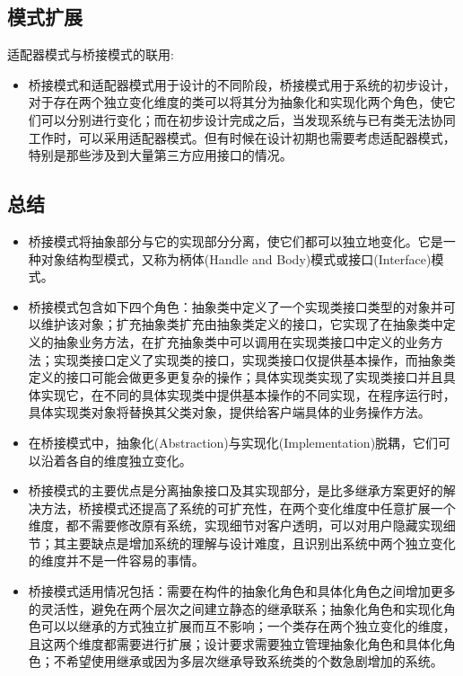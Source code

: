 \documentclass[letterpaper,10pt,english]{sphinxmanual}
\begin{document}
\subsection{模式扩展}
\label{\detokenize{structural_patterns/bridge:id14}}
\sphinxAtStartPar
适配器模式与桥接模式的联用:
\begin{itemize}
\item {} 
\sphinxAtStartPar
桥接模式和适配器模式用于设计的不同阶段，桥接模式用于系统的初步设计，对于存在两个独立变化维度的类可以将其分为抽象化和实现化两个角色，使它们可以分别进行变化；而在初步设计完成之后，当发现系统与已有类无法协同工作时，可以采用适配器模式。但有时候在设计初期也需要考虑适配器模式，特别是那些涉及到大量第三方应用接口的情况。

\end{itemize}


\subsection{总结}
\label{\detokenize{structural_patterns/bridge:id15}}\begin{itemize}
\item {} 
\sphinxAtStartPar
桥接模式将抽象部分与它的实现部分分离，使它们都可以独立地变化。它是一种对象结构型模式，又称为柄体(Handle and Body)模式或接口(Interface)模式。

\item {} 
\sphinxAtStartPar
桥接模式包含如下四个角色：抽象类中定义了一个实现类接口类型的对象并可以维护该对象；扩充抽象类扩充由抽象类定义的接口，它实现了在抽象类中定义的抽象业务方法，在扩充抽象类中可以调用在实现类接口中定义的业务方法；实现类接口定义了实现类的接口，实现类接口仅提供基本操作，而抽象类定义的接口可能会做更多更复杂的操作；具体实现类实现了实现类接口并且具体实现它，在不同的具体实现类中提供基本操作的不同实现，在程序运行时，具体实现类对象将替换其父类对象，提供给客户端具体的业务操作方法。

\item {} 
\sphinxAtStartPar
在桥接模式中，抽象化(Abstraction)与实现化(Implementation)脱耦，它们可以沿着各自的维度独立变化。

\item {} 
\sphinxAtStartPar
桥接模式的主要优点是分离抽象接口及其实现部分，是比多继承方案更好的解决方法，桥接模式还提高了系统的可扩充性，在两个变化维度中任意扩展一个维度，都不需要修改原有系统，实现细节对客户透明，可以对用户隐藏实现细节；其主要缺点是增加系统的理解与设计难度，且识别出系统中两个独立变化的维度并不是一件容易的事情。

\item {} 
\sphinxAtStartPar
桥接模式适用情况包括：需要在构件的抽象化角色和具体化角色之间增加更多的灵活性，避免在两个层次之间建立静态的继承联系；抽象化角色和实现化角色可以以继承的方式独立扩展而互不影响；一个类存在两个独立变化的维度，且这两个维度都需要进行扩展；设计要求需要独立管理抽象化角色和具体化角色；不希望使用继承或因为多层次继承导致系统类的个数急剧增加的系统。

\end{itemize}
\end{document}
